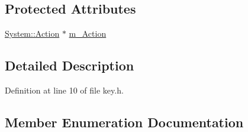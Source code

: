 \subsection*{Protected Attributes}
\begin{DoxyCompactItemize}
\item 
\hyperlink{namespace_tri_1_1_input_1_1_system_a79600e9f4ed835251eed1706ce96bed0}{System\+::\+Action} $\ast$ \hyperlink{struct_tri_1_1_input_1_1_key_a4118499d9e3680859c603e1f70a2bcc3}{m\+\_\+\+Action}
\end{DoxyCompactItemize}


\subsection{Detailed Description}


Definition at line 10 of file key.\+h.



\subsection{Member Enumeration Documentation}
\hypertarget{struct_tri_1_1_input_1_1_key_a0b1f54fb1b7be8fe2e920ca8552f86dc}{}
